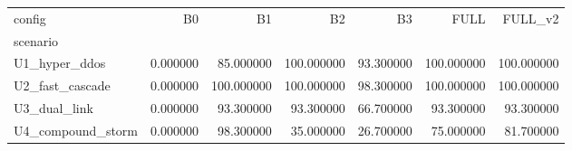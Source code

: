 \begin{tabular}{lrrrrrr}
\toprule
config & B0 & B1 & B2 & B3 & FULL & FULL_v2 \\
scenario &  &  &  &  &  &  \\
\midrule
U1_hyper_ddos & 0.000000 & 85.000000 & 100.000000 & 93.300000 & 100.000000 & 100.000000 \\
U2_fast_cascade & 0.000000 & 100.000000 & 100.000000 & 98.300000 & 100.000000 & 100.000000 \\
U3_dual_link & 0.000000 & 93.300000 & 93.300000 & 66.700000 & 93.300000 & 93.300000 \\
U4_compound_storm & 0.000000 & 98.300000 & 35.000000 & 26.700000 & 75.000000 & 81.700000 \\
\bottomrule
\end{tabular}
